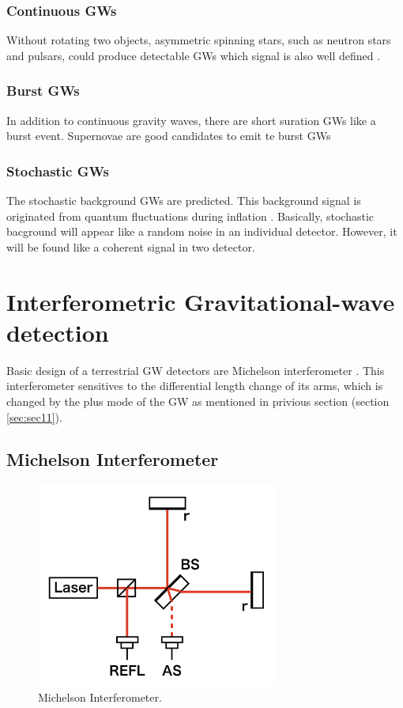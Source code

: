 \subsubsection{Continuous GWs}
Without rotating two objects, asymmetric spinning stars, such as neutron stars and pulsars, could produce detectable GWs which signal is also well defined \cite{leaci2012searching,hereld1984search}.

\subsubsection{Burst GWs}
In addition to continuous gravity waves, there are short suration GWs like a burst event. Supernovae are good candidates to emit te burst GWs \cite{ott2004gravitational}

\subsubsection{Stochastic GWs}
The stochastic background GWs are predicted\cite{starobinskii1979spectrum,Christensen_2018}. This background signal is originated from quantum fluctuations during inflation \cite{PhysRevD.23.347}. Basically, stochastic bacground will appear like a random noise in an individual detector. However, it will be found like a coherent signal in two detector.



\section{Interferometric Gravitational-wave detection} \label{sec:12}
Basic design of a terrestrial GW detectors are Michelson interferometer \cite{weiss1972electronically}. This interferometer sensitives to the differential length change of its arms, which is changed by the plus mode of the GW as mentioned in privious section (section \ref{sec:sec11}).

\subsection{Michelson Interferometer} \label{sec:121}
\begin{figure}[h]
  \begin{center}   
    \includegraphics[width=8.0cm]{./img_chap1/img132.png}
    \caption{Michelson Interferometer. }\label{img:img132}
  \end{center}
\end{figure}

